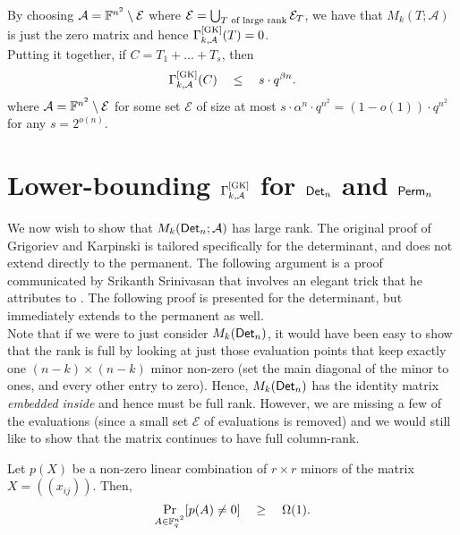  By choosing $\mathcal{A} = \mathbb{F}^{n^2} \setminus \mathcal{E}$ where $\mathcal{E} = \bigcup_{\text{$T$ of large rank}} \mathcal{E}_T$, we have that $M_k(T;\mathcal{A})$ is just the zero matrix and hence
 $\Gamma^{\mathrm{[GK]}}_{k,\mathcal{A}}(T) = 0$.\\


Putting it together, if $C = T_1 + \dots + T_s$, then 
\begin{equation}\label{eqn:gk-upper-bound-circuit}
\Gamma^{\mathrm{[GK]}}_{k,\mathcal{A}}(C) \quad \leq \quad s \cdot
q^{\beta n}.
\end{equation} 
where $\mathcal{A} = \mathbb{F}^{n^2} \setminus \mathcal{E}$ for some set $\mathcal{E}$ of size at most $s \cdot \alpha^n \cdot  q^{n^2} = (1 - o(1)) \cdot q^{n^2}$ for any $s = 2^{o(n)}$.

\section{Lower-bounding $\Gamma^{\mathrm{[GK]}}_{k,\mathcal{A}}$ for $\mathsf{Det}_n$ and $\mathsf{Perm}_n$}

We now wish to show that $M_k(\mathsf{Det}_n;\mathcal{A})$ has large rank. The original proof of Grigoriev and Karpinski is tailored specifically for the determinant, and does not extend directly to the permanent. The following argument is a proof communicated by Srikanth Srinivasan \cite{Srikanth13} that involves an elegant trick that he attributes to \cite{Koutis08}. The following proof is presented for the determinant, but immediately extends to the permanent as well. \\


Note that if we were to just consider $M_k(\mathsf{Det}_n)$, it would have been easy to show that the rank is full by looking at just those evaluation points that keep exactly one $(n-k)\times (n-k)$ minor non-zero (set the main diagonal of the minor to ones, and every other entry to zero). Hence, $M_k(\mathsf{Det}_n)$ has the identity matrix \emph{embedded inside} and hence must be full rank. However, we are missing a few of the evaluations (since a small set $\mathcal{E}$ of evaluations is removed) and we would still like to show that the matrix continues to have full column-rank. 

\begin{lemma}\label{lem:random-lc-det-nonzero}
  Let $p(X)$ be a non-zero linear combination of $r\times r$
  minors of the matrix $X = (\!(x_{ij})\!)$. Then, 
  $$
  \Pr_{A\in \mathbb{F}_q^{n^2}}[p(A) \neq 0] \quad \geq \quad \Omega(1).
  $$
\end{lemma}

